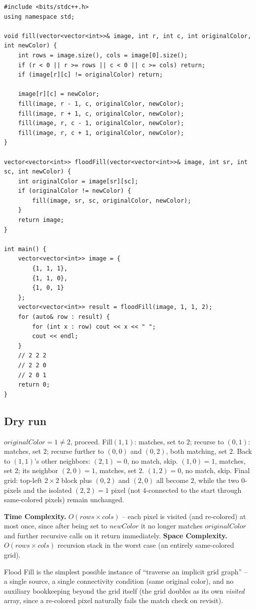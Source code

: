 \begin{lstlisting}
#include <bits/stdc++.h>
using namespace std;

void fill(vector<vector<int>>& image, int r, int c, int originalColor, int newColor) {
    int rows = image.size(), cols = image[0].size();
    if (r < 0 || r >= rows || c < 0 || c >= cols) return;
    if (image[r][c] != originalColor) return;

    image[r][c] = newColor;
    fill(image, r - 1, c, originalColor, newColor);
    fill(image, r + 1, c, originalColor, newColor);
    fill(image, r, c - 1, originalColor, newColor);
    fill(image, r, c + 1, originalColor, newColor);
}

vector<vector<int>> floodFill(vector<vector<int>>& image, int sr, int sc, int newColor) {
    int originalColor = image[sr][sc];
    if (originalColor != newColor) {
        fill(image, sr, sc, originalColor, newColor);
    }
    return image;
}

int main() {
    vector<vector<int>> image = {
        {1, 1, 1},
        {1, 1, 0},
        {1, 0, 1}
    };
    vector<vector<int>> result = floodFill(image, 1, 1, 2);
    for (auto& row : result) {
        for (int x : row) cout << x << " ";
        cout << endl;
    }
    // 2 2 2
    // 2 2 0
    // 2 0 1
    return 0;
}
\end{lstlisting}

\subsection*{Dry run}


$\textit{originalColor}=1 \neq 2$, proceed. Fill$(1,1)$: matches,
set to $2$; recurse to $(0,1)$: matches, set $2$; recurse further to
$(0,0)$ and $(0,2)$, both matching, set $2$. Back to $(1,1)$'s other
neighbors: $(2,1)=0$, no match, skip. $(1,0)=1$, matches, set $2$;
its neighbor $(2,0)=1$, matches, set $2$. $(1,2)=0$, no match, skip.
Final grid: top-left $2\times2$ block plus $(0,2)$ and $(2,0)$ all
become $2$, while the two $0$-pixels and the isolated $(2,2)=1$ pixel
(not $4$-connected to the start through same-colored pixels) remain
unchanged.

\begin{complexitybox}
\textbf{Time Complexity.} $O(\textit{rows} \times \textit{cols})$ --
each pixel is visited (and re-colored) at most once, since after being
set to $\textit{newColor}$ it no longer matches $\textit{originalColor}$
and further recursive calls on it return immediately.
\textbf{Space Complexity.} $O(\textit{rows} \times \textit{cols})$
recursion stack in the worst case (an entirely same-colored grid).
\end{complexitybox}

\begin{takeawaybox}
Flood Fill is the simplest possible instance of ``traverse an implicit
grid graph'' -- a single source, a single connectivity condition (same
original color), and no auxiliary bookkeeping beyond the grid itself
(the grid doubles as its own \textit{visited} array, since a re-colored
pixel naturally fails the match check on revisit).
\end{takeawaybox}

